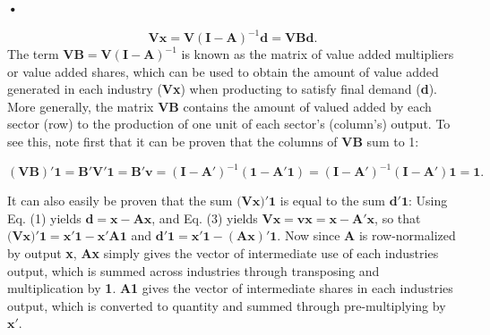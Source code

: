 \textbf{\textbf{•}}\documentclass[a4paper]{article}
\begin{document}
\begin{equation} \label{eq:VB}
\textbf{V}\textbf{x} = \textbf{V}(\textbf{I}-\textbf{A})^{-1} \textbf{d} = \textbf{VBd}.
\end{equation}
The term $\textbf{VB} = \textbf{V}(\textbf{I}-\textbf{A})^{-1}$ is known as the matrix of value added multipliers or value added shares, which can be used to obtain the amount of value added generated in each industry (\textbf{Vx}) when producting to satisfy final demand (\textbf{d}). More generally, the matrix $\textbf{VB}$ contains the amount of valued added by each sector (row) to the production of one unit of each sector's (column's) output.  To see this, note first that it can be proven that the columns of \textbf{VB} sum to 1:

\begin{equation} \label{eq:VBproof}
(\textbf{VB})'\textbf{1} = \textbf{B}'\textbf{V}'\textbf{1} =  \textbf{B}'\textbf{v}  = (\textbf{I}-\textbf{A}')^{-1}  (\textbf{1}-\textbf{A}'\textbf{1}) = (\textbf{I}-\textbf{A}')^{-1}  (\textbf{I}-\textbf{A}')\textbf{1} = \textbf{1}.
\end{equation}



It can also easily be proven that the sum $\textbf{(Vx)}'\textbf{1}$ is equal to the sum $\textbf{d}'\textbf{1}$: Using Eq. (1) yields $\textbf{d} = \textbf{x} - \textbf{Ax}$, and Eq. (3) yields $\textbf{Vx} = \textbf{vx} = \textbf{x} - \textbf{A}'\textbf{x}$, so that $\textbf{(Vx)}'\textbf{1} = \textbf{x}'\textbf{1} - \textbf{x}'\textbf{A}\textbf{1}$ and $\textbf{d}'\textbf{1} = \textbf{x}'\textbf{1} - (\textbf{A}\textbf{x})'\textbf{1}$. Now since \textbf{A} is row-normalized by output \textbf{x}, \textbf{Ax} simply gives the vector of intermediate use of each industries output, which is summed across industries through transposing and multiplication by \textbf{1}.  \textbf{A}\textbf{1} gives the vector of intermediate shares in each industries output, which is converted to quantity and summed through pre-multiplying by $\textbf{x}'$. \newline
\end{document}
